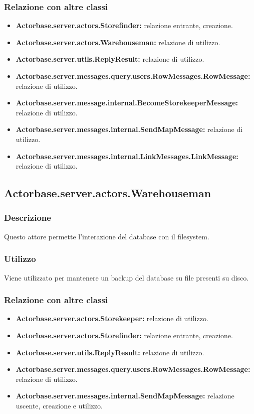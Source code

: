 \documentclass[a4paper]{article}
\begin{document}
			\subsubsection{Relazione con altre classi}
				\begin{itemize}
					\item \textbf{Actorbase.server.actors.Storefinder:} relazione entrante, creazione.
					\item \textbf{Actorbase.server.actors.Warehouseman:} relazione di utilizzo.
					\item \textbf{Actorbase.server.utils.ReplyResult:} relazione di utilizzo.
					\item \textbf{Actorbase.server.messages.query.users.RowMessages.RowMessage:} relazione di utilizzo.
					\item \textbf{Actorbase.server.message.internal.BecomeStorekeeperMessage:} relazione di utilizzo.
					\item \textbf{Actorbase.server.messages.internal.SendMapMessage:} relazione di utilizzo.
					\item \textbf{Actorbase.server.messages.internal.LinkMessages.LinkMessage:} relazione di utilizzo.
				\end{itemize}
		
		\subsection{Actorbase.server.actors.Warehouseman}
			\subsubsection{Descrizione}
				Questo attore permette l'interazione del database con il filesystem.
				
			\subsubsection{Utilizzo}
				Viene utilizzato per mantenere un backup del database su file presenti su disco. 
				
			\subsubsection{Relazione con altre classi}
				\begin{itemize}
					\item \textbf{Actorbase.server.actors.Storekeeper:} relazione di utilizzo.
					\item \textbf{Actorbase.server.actors.Storefinder:} relazione entrante, creazione.
					\item \textbf{Actorbase.server.utils.ReplyResult:} relazione di utilizzo.
					\item \textbf{Actorbase.server.messages.query.users.RowMessages.RowMessage:} relazione di utilizzo.
					\item \textbf{Actorbase.server.messages.internal.SendMapMessage:} relazione uscente, creazione e utilizzo.
				\end{itemize}
				
\end{document}
